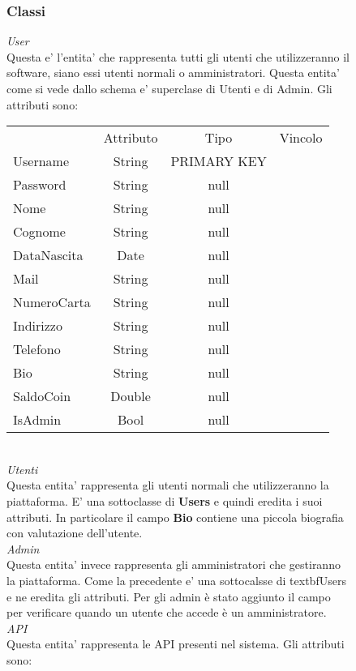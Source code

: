 {{\begin{figure}[ht]
			\subsubsection{Classi}
			\textit{User}\\
			Questa e' l'entita' che rappresenta tutti gli utenti che utilizzeranno il software, siano essi utenti normali o amministratori. Questa entita' come si vede dallo schema e' superclase di Utenti e di Admin. Gli attributi sono: 
			\begin{center}
			\begin{tabular}{lccc}
				&Attributo&Tipo&Vincolo\\
				Username&String&PRIMARY KEY\\
				Password&String&null\\
				Nome&String&null \\
				Cognome&String&null \\
				DataNascita&Date&null\\
				Mail&String&null \\
				NumeroCarta&String&null \\
				Indirizzo&String&null \\
				Telefono&String&null \\
				Bio&String&null \\
				SaldoCoin&Double&null \\
				IsAdmin&Bool&null\\
			\end{tabular}
			\end{center} \\
			\textit{Utenti}\\
			Questa entita' rappresenta gli utenti normali che utilizzeranno la piattaforma. E' una sottoclasse di \textbf{Users} e quindi eredita i suoi attributi. In particolare il campo \textbf{Bio} contiene una piccola biografia con valutazione dell'utente.  \\
			\textit{Admin}\\
			Questa entita' invece rappresenta gli amministratori che gestiranno la piattaforma. Come la precedente e' una sottocalsse di textbf{Users} e ne eredita gli attributi. Per gli admin è stato aggiunto il campo  per verificare quando un utente che accede è un amministratore. \\
			\textit{API}\\
			Questa entita' rappresenta le API presenti nel sistema. Gli attributi sono:
			\begin{center}
			\begin{tabular}{lccc}

\end{tabular}
\end{center}
\end{figure}}}
